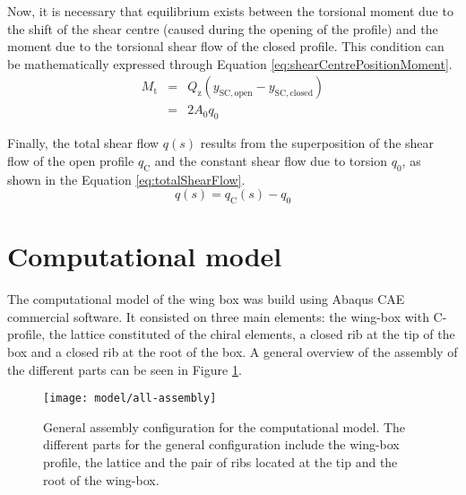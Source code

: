   Now, it is necessary that equilibrium exists between the torsional moment due to the shift of the shear centre (caused during the opening of the profile) and the moment due to the torsional shear flow of the closed profile. This condition can be mathematically expressed through Equation \ref{eq:shearCentrePositionMoment}.
  \begin{eqnarray}\label{eq:shearCentrePositionMoment}
    M_\mathrm{t} &=& Q_\mathrm{z} (y_{\mathrm{SC,open}} - y_{\mathrm{SC,closed}}) \nonumber \\
    &=& 2 A_0 q_0
  \end{eqnarray}

  Finally, the total shear flow $q(s)$ results from the superposition of the shear flow of the open profile $q_\mathrm{C}$ and the constant shear flow due to torsion $q_0$, as shown in the Equation \ref{eq:totalShearFlow}.
  \begin{equation}\label{eq:totalShearFlow}
    q(s) = q_\mathrm{C}(s) - q_0 %
  \end{equation}

\section{Computational model} \label{sec:computationalModel}

  The computational model of the wing box was build using Abaqus CAE commercial software. It consisted on three main elements: the wing-box with C-profile, the lattice constituted of the chiral elements, a closed rib at the tip of the box and a closed rib at the root of the box. A general overview of the assembly of the different parts can be seen in Figure \ref{fig:all-assembly}.

  \begin{figure}[!htpb]
    \centering
    \texttt{[image: model/all-assembly]}
    \caption[General assembly configuration for the computational model]{General assembly configuration for the computational model. The different parts for the general configuration include the wing-box profile, the lattice and the pair of ribs located at the tip and the root of the wing-box.}\label{fig:all-assembly}
  \end{figure}

